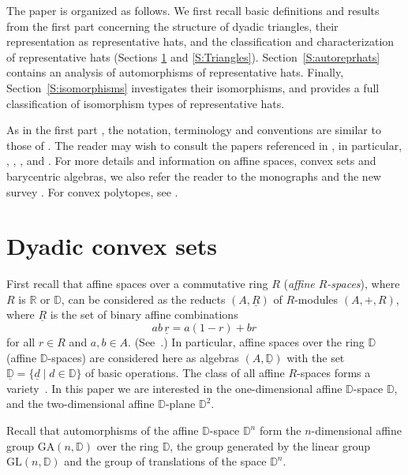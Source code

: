 \documentclass[12pt]{amsart}
\def\mbR{\mathbb{R}}
\def\mbD{\mathbb{D}}
\theoremstyle{plain}
\theoremstyle{definition}
\numberwithin{equation}{section}
\begin{document}
The paper is organized as follows. We first recall basic definitions and results from the first part concerning the structure of dyadic triangles, their representation as representative hats, and the classification and characterization of representative hats (Sections \ref{S:Dyadconvsets} and \ref{S:Triangles}). Section~\ref{S:autoreprhats} contains an analysis of automorphisms of representative hats. Finally, Section~\ref{S:isomorphisms} investigates their isomorphisms, and provides a full
classification of isomorphism types of representative hats.

As in the first part \cite{MR25}, the notation, terminology and conventions are similar to those of \cite{RS02}. The reader may wish to consult the papers referenced in \cite{MR25}, in particular, \cite{CR13}, \cite{MMR19}, \cite{MMR19a}, \cite{MMR23} and \cite{MRS11}. For more details and information on affine spaces, convex sets and barycentric algebras, we also refer the reader to the monographs \cite{RS85, RS02} and the new survey \cite{R18}. For convex polytopes, see \cite{AB83, BG03, Z95}.



\section{Dyadic convex sets}\label{S:Dyadconvsets}

First recall that affine spaces over a commutative ring $R$ (\emph{affine $R$-spaces}), where $R$ is $\mbR$ or $\mbD$, can be considered as the reducts $(A,\underline{R})$ of $R$-modules $(A,+,R)$, where $\underline{R}$ is the set of binary affine combinations
\begin{equation}\label{E:afoper}
ab\,\underline{r} = a(1-r)+br \,
\end{equation}
for all $r \in R$ and $a,b \in A$. (See~\cite[\S~5.3, \S~6.3]{RS02}.) In particular,
affine spaces over the ring $\mbD$ (affine $\mbD$-spaces) are considered here as algebras
$(A,\underline{\mbD})$ with the set $\underline{\mbD} = \{\underline{d} \mid d \in \mbD\}$ of
basic operations. The class of all affine $R$-spaces forms a variety~\cite{C75}.
In this paper we are interested in the one-dimensional affine $\mbD$-space $\mbD$, and the two-dimensional affine $\mbD$-plane $\mbD^2$.

Recall that automorphisms of the affine $\mbD$-space $\mbD^n$ form the $n$-dimensional
affine group $\mathrm{GA}(n,\mbD)$ over the ring $\mbD$, the group generated by the linear group $\mathrm{GL}(n,\mbD)$ and the group of translations of the space $\mbD^n$.
\end{document}
